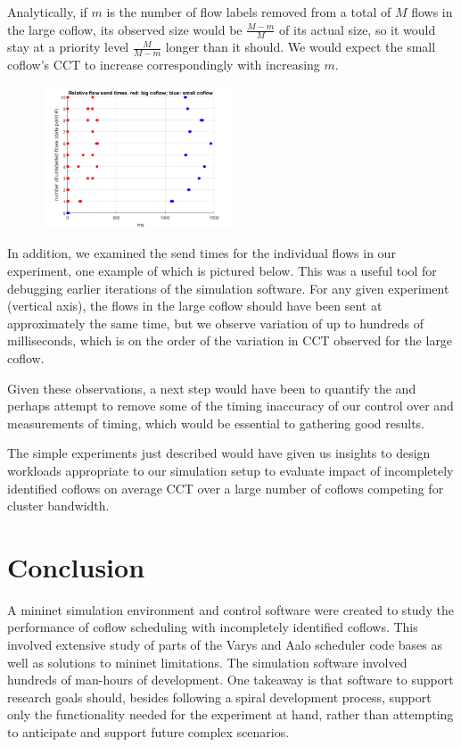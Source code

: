 \documentclass[conference]{IEEEtran}
\begin{document}
Analytically, if $m$ is the number of flow labels removed from a total of $M$ flows in the large coflow, its observed size would be $\frac{M-m}{M}$ of its actual size, so it would stay at a priority level $\frac{M}{M-m}$ longer than it should. We would expect the small coflow's CCT to increase correspondingly with increasing $m$.

\begin{figure}
\includegraphics[width=0.5\textwidth]{sendtimes.png}
\end{figure}

In addition, we examined the send times for the individual flows in our experiment, one example of which is pictured below. This was a useful tool for debugging earlier iterations of the simulation software. For any given experiment (vertical axis), the flows in the large coflow should have been sent at approximately the same time, but we observe variation of up to hundreds of milliseconds, which is on the order of the variation in CCT observed for the large coflow.

Given these observations, a next step would have been to quantify the and perhaps attempt to remove some of the timing inaccuracy of our control over and measurements of timing, which would be essential to gathering good results.

The simple experiments just described would have given us insights to design workloads appropriate to our simulation setup to evaluate impact of incompletely identified coflows on average CCT over a large number of coflows competing for cluster bandwidth.

\section{Conclusion}

A mininet simulation environment and control software were created to study the performance of coflow scheduling with incompletely identified coflows. This involved extensive study of parts of the Varys and Aalo scheduler code bases as well as solutions to mininet limitations. The simulation software involved hundreds of man-hours of development. One takeaway is that software to support research goals should, besides following a spiral development process, support only the functionality needed for the experiment at hand, rather than attempting to anticipate and support future complex scenarios.
\end{document}
